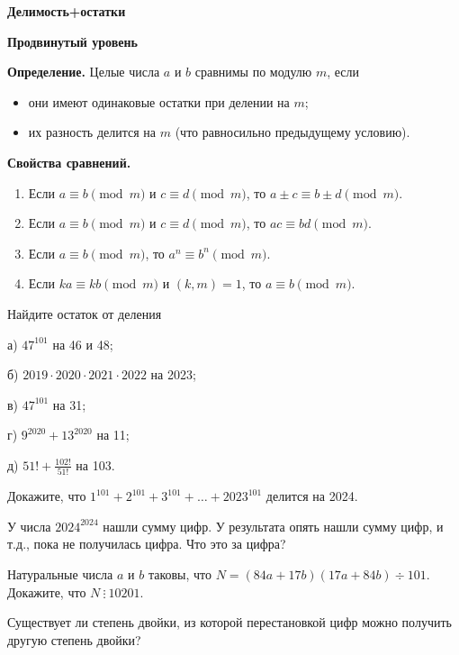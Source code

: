 \newpage

\hspace{3mm}

\centerline{\bf \Huge Делимость+остатки}

\centerline{\bf \large Продвинутый уровень}

\begin{flushright}
        \scriptsize{}
\end{flushright}

\textbf{Определение.} Целые числа \( a \) и \( b \) сравнимы по модулю \( m \), если
\begin{itemize}
    \item они имеют одинаковые остатки при делении на \( m \);
    \item их разность делится на \( m \) (что равносильно предыдущему условию).
\end{itemize}

\textbf{Свойства сравнений.}
\begin{enumerate}
    \item Если \( a \equiv b \pmod{m} \) и \( c \equiv d \pmod{m} \), то \( a \pm c \equiv b \pm d \pmod{m} \).
    \item Если \( a \equiv b \pmod{m} \) и \( c \equiv d \pmod{m} \), то \( ac \equiv bd \pmod{m} \).
    \item Если \( a \equiv b \pmod{m} \), то \( a^n \equiv b^n \pmod{m} \).
    \item Если \( ka \equiv kb \pmod{m} \) и \( (k, m) = 1\), то \( a \equiv b \pmod{m} \).
\end{enumerate}

 Найдите остаток от деления

а) \( 47^{101} \) на 46 и 48;

б) \( 2019 \cdot 2020 \cdot 2021 \cdot 2022 \) на 2023;

в) \( 47^{101} \) на 31;

г) \( 9^{2020} + 13^{2020} \) на 11;

д) \( 51! + \frac{102!}{51!} \) на 103.


 Докажите, что \( 1^{101} + 2^{101} + 3^{101} + \ldots + 2023^{101} \) делится на 2024.


 У числа \( 2024^{2024} \) нашли сумму цифр. У результата опять нашли сумму цифр, и т.д., пока не получилась цифра. Что это за цифра?

 Натуральные числа \( a \) и \( b \) таковы, что \( N = (84a + 17b)(17a + 84b) \div 101 \). Докажите, что \( N \ \vdots \ 10201 \).

Существует ли степень двойки, из которой перестановкой цифр можно получить другую степень двойки?